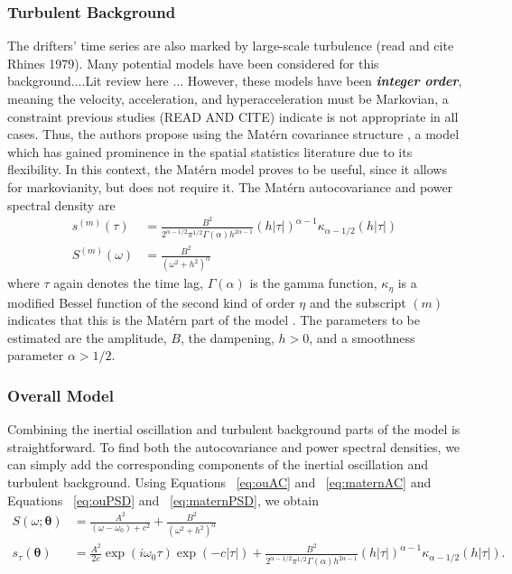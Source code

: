 \documentclass{stat572Style}
\begin{document}
\subsubsection{Turbulent Background}
The drifters' time series are also marked by large-scale turbulence (read and cite Rhines 1979). Many potential models have been considered for this background....Lit review here ... However, these models have been \textbf{\it{integer order}}, meaning the velocity, acceleration, and hyperacceleration must be Markovian, a constraint previous studies (READ AND CITE) indicate is not appropriate in all cases. Thus, the authors propose using the Mat\'{e}rn covariance structure \citep{Gneiting2012}, a model which has gained prominence in the spatial statistics literature due to its flexibility. In this context, the Mat\'{e}rn model proves to be useful, since it allows for markovianity, but does not require it.  The Mat\'{e}rn  autocovariance and power spectral density are
\begin{align}
\label{eq:maternAC}
s^{(m)}(\tau) &= \frac{B^{2}}{2^{\alpha - 1/2}\pi^{1/2} \Gamma(\alpha) h^{2 \alpha - 1}}(h|\tau|)^{\alpha - 1}\kappa_{\alpha - 1/2}(h|\tau|)\\
\label{eq:maternPSD}
S^{(m)}(\omega) &= \frac{B^{2}}{(\omega^{2} + h^{2})^{\alpha}}
\end{align}
where $\tau$ again denotes the time lag, $\Gamma(\alpha)$ is the gamma function,  $\kappa_{\eta}$ is a modified Bessel function of the second kind of order $\eta$  and the subscript $(m)$ indicates that this is the Mat\'{e}rn part of the model \citep{Stein2012}. The parameters to be estimated are the amplitude, $B$, the dampening, $h > 0$, and a smoothness parameter $\alpha > 1/2$. 

\subsubsection{Overall Model}
Combining the inertial oscillation and turbulent background parts of the model is straightforward. To find both the autocovariance and power spectral densities, we can simply add the corresponding components of the inertial oscillation and turbulent background. Using Equations ~\ref{eq:ouAC} and ~\ref{eq:maternAC} and Equations ~\ref{eq:ouPSD} and ~\ref{eq:maternPSD}, we obtain
\begin{align}
S(\omega; \boldsymbol{\theta}) &= \frac{A^{2}}{(\omega - \omega_{0}) + c^{2}} + \frac{B^{2}}{(\omega^{2} + h^{2})^{\alpha}}\\
\label{eq: fullSpec}
s_{\tau}(\boldsymbol{\theta}) &= \frac{A^{2}}{2c} \exp(i \omega_{0}\tau) \exp(-c|\tau|) +  \frac{B^{2}}{2^{\alpha - 1/2}\pi^{1/2} \Gamma(\alpha) h^{2 \alpha - 1}}(h|\tau|)^{\alpha - 1}\kappa_{\alpha - 1/2}(h|\tau|).
\end{align}
\end{document}
